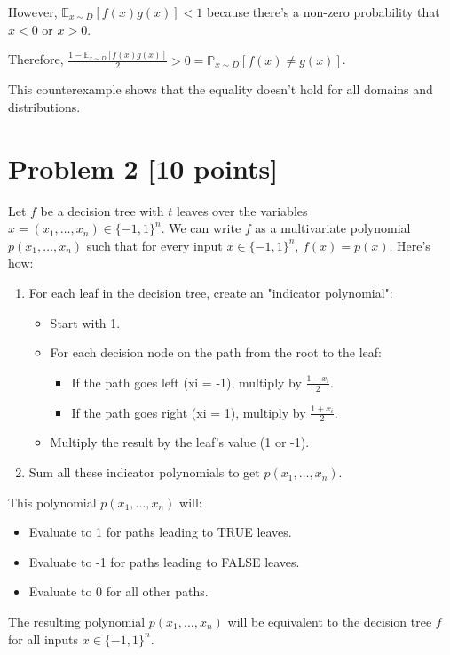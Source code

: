 \documentclass{article}
\begin{document}
However, $\mathbb{E}_{x\sim D}[f(x)g(x)] < 1$ because there's a non-zero probability that $x < 0$ or $x > 0$.

Therefore, $\frac{1 - \mathbb{E}_{x\sim D}[f(x)g(x)]}{2} > 0 = \mathbb{P}_{x\sim D}[f(x) \neq g(x)]$.

This counterexample shows that the equality doesn't hold for all domains and distributions.

\section*{Problem 2 [10 points]}
Let $f$ be a decision tree with $t$ leaves over the variables $x = (x_1,\ldots,x_n) \in \{-1,1\}^n$. We can write $f$ as a multivariate polynomial $p(x_1,\ldots,x_n)$ such that for every input $x \in \{-1,1\}^n$, $f(x) = p(x)$. Here's how:

\begin{enumerate}
    \item For each leaf in the decision tree, create an "indicator polynomial":
    \begin{itemize}
        \item Start with 1.
        \item For each decision node on the path from the root to the leaf:
        \begin{itemize}
            \item If the path goes left (xi = -1), multiply by $\frac{1-x_i}{2}$.
            \item If the path goes right (xi = 1), multiply by $\frac{1+x_i}{2}$.
        \end{itemize}
        \item Multiply the result by the leaf's value (1 or -1).
    \end{itemize}
    
    \item Sum all these indicator polynomials to get $p(x_1,\ldots,x_n)$.
\end{enumerate}

This polynomial $p(x_1,\ldots,x_n)$ will:
\begin{itemize}
    \item Evaluate to 1 for paths leading to TRUE leaves.
    \item Evaluate to -1 for paths leading to FALSE leaves.
    \item Evaluate to 0 for all other paths.
\end{itemize}

The resulting polynomial $p(x_1,\ldots,x_n)$ will be equivalent to the decision tree $f$ for all inputs $x \in \{-1,1\}^n$.
\end{document}
